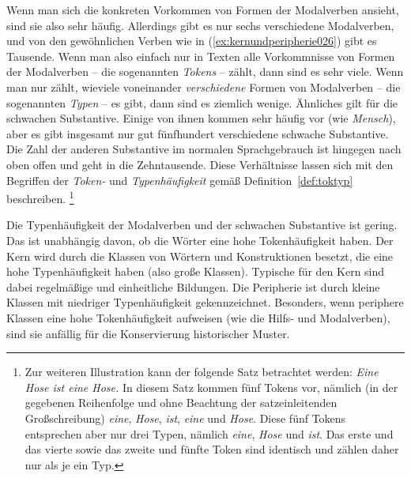 \label{abs:typetoken}
Wenn man sich die konkreten Vorkommen von Formen der Modalverben ansieht, sind sie also sehr häufig.
Allerdings gibt es nur sechs verschiedene Modalverben, und von den gewöhnlichen Verben wie in (\ref{ex:kernundperipherie026}) gibt es Tausende.
Wenn man also einfach nur in Texten alle Vorkommnisse von Formen der Modalverben -- die sogenannten \textit{Tokens} -- zählt, dann sind es sehr viele.
Wenn man nur zählt, wieviele voneinander \textit{verschiedene} Formen von Modalverben -- die sogenannten \textit{Typen} -- es gibt, dann sind es ziemlich wenige.
Ähnliches gilt für die schwachen Substantive.
Einige von ihnen kommen sehr häufig vor (wie \textit{Mensch}), aber es gibt insgesamt nur gut fünfhundert verschiedene schwache Substantive.
Die Zahl der anderen Substantive im normalen Sprachgebrauch ist hingegen nach oben offen und geht in die Zehntausende.
Diese Verhältnisse lassen sich mit den Begriffen der \textit{Token-} und \textit{Typenhäufigkeit} gemäß Definition~\ref{def:toktyp} beschreiben.%
\footnote{Zur weiteren Illustration kann der folgende Satz betrachtet werden:
\textit{Eine Hose ist eine Hose.}
In diesem Satz kommen fünf Tokens vor, nämlich (in der gegebenen Reihenfolge und ohne Beachtung der satzeinleitenden Großschreibung) \textit{eine}, \textit{Hose}, \textit{ist}, \textit{eine} und \textit{Hose}.
Diese fünf Tokens entsprechen aber nur drei Typen, nämlich \textit{eine}, \textit{Hose} und \textit{ist}.
Das erste und das vierte sowie das zweite und fünfte Token sind identisch und zählen daher nur als je ein Typ.
}



Die Typenhäufigkeit der Modalverben und der schwachen Substantive ist gering.
Das ist unabhängig davon, ob die Wörter eine hohe Tokenhäufigkeit haben.
Der Kern wird durch die Klassen von Wörtern und Konstruktionen besetzt, die eine hohe Typenhäufigkeit haben (also große Klassen).
Typische für den Kern sind dabei regelmäßige und einheitliche Bildungen.
Die Peripherie ist durch kleine Klassen mit niedriger Typenhäufigkeit gekennzeichnet.
Besonders, wenn periphere Klassen eine hohe Tokenhäufigkeit aufweisen (wie die Hilfs- und Modalverben), sind sie anfällig für die Konservierung historischer Muster.


